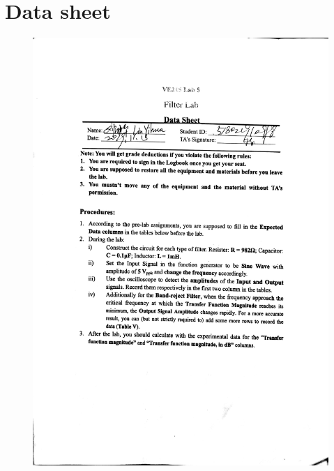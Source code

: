 \documentclass[a4paper]{report}
\begin{document}
\section*{Data sheet}
\newpage
\begin{figure}[H]
	\centering
	\includegraphics[width=1\linewidth]{13.jpg}
\end{figure}
\end{document}
